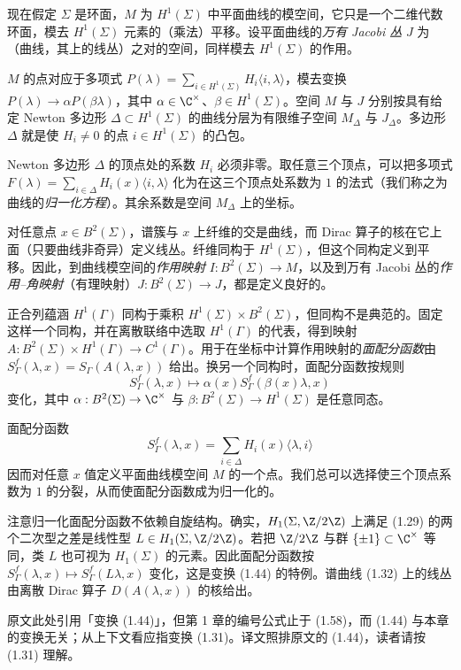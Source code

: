 现在假定 $\Sigma$ 是环面，$M$ 为 $H^1(\Sigma)$ 中平面曲线的模空间，它只是一个二维代数环面，模去 $H^1(\Sigma)$ 元素的（乘法）平移。设平面曲线的\emph{万有 Jacobi 丛} $J$ 为（曲线，其上的线丛）之对的空间，同样模去 $H^1(\Sigma)$ 的作用。

$M$ 的点对应于多项式 $P(\lambda)=\sum_{i\in H^1(\Sigma)}H_i\langle i,\lambda\rangle$，模去变换 $P(\lambda)\to\alpha P(\beta\lambda)$，其中 $\alpha\in\C^\times$、$\beta\in H^1(\Sigma)$。空间 $M$ 与 $J$ 分别按具有给定 Newton 多边形 $\Delta\subset H^1(\Sigma)$ 的曲线分层为有限维子空间 $M_\Delta$ 与 $J_\Delta$。多边形 $\Delta$ 就是使 $H_i\neq0$ 的点 $i\in H^1(\Sigma)$ 的凸包。

Newton 多边形 $\Delta$ 的顶点处的系数 $H_i$ 必须非零。取任意三个顶点，可以把多项式 $F(\lambda)=\sum_{i\in\Delta}H_i(x)\langle i,\lambda\rangle$ 化为在这三个顶点处系数为 $1$ 的法式（我们称之为曲线的\emph{归一化方程}）。其余系数是空间 $M_\Delta$ 上的坐标。

对任意点 $x\in B^2(\Sigma)$，谱簇与 $x$ 上纤维的交是曲线，而 Dirac 算子的核在它上面（只要曲线非奇异）定义线丛。纤维同构于 $H^1(\Sigma)$，但这个同构定义到平移。因此，到曲线模空间的\emph{作用映射} $I: B^2(\Sigma)\to M$，以及到万有 Jacobi 丛的\emph{作用–角映射}（有理映射）$J: B^2(\Sigma)\to J$，都是定义良好的。

正合列蕴涵 $H^1(\Gamma)$ 同构于乘积 $H^1(\Sigma)\times B^2(\Sigma)$，但同构不是典范的。固定这样一个同构，并在离散联络中选取 $H^1(\Gamma)$ 的代表，得到映射 $A: B^2(\Sigma)\times H^1(\Gamma)\to C^1(\Gamma)$。用于在坐标中计算作用映射的\emph{面配分函数}由 $S^f_\Gamma(\lambda,x)=S_\Gamma(A(\lambda,x))$ 给出。换另一个同构时，面配分函数按规则
\begin{equation}\label{eq:1.31}
S^f_\Gamma(\lambda,x)\mapsto\alpha(x)S^f_\Gamma(\beta(x)\lambda,x)
\tag{1.31}
\end{equation}
变化，其中 $\alpha: B^2(\Sigma)\to\C^\times$ 与 $\beta: B^2(\Sigma)\to H^1(\Sigma)$ 是任意同态。

面配分函数
\begin{equation}\label{eq:1.32}
S^f_\Gamma(\lambda,x)=\sum_{i\in\Delta}H_i(x)\langle\lambda,i\rangle
\tag{1.32}
\end{equation}
因而对任意 $x$ 值定义平面曲线模空间 $M$ 的一个点。我们总可以选择使三个顶点系数为 $1$ 的分裂，从而使面配分函数成为归一化的。

注意归一化面配分函数不依赖自旋结构。确实，$H_1(\Sigma,\Z/2\Z)$ 上满足 (1.29) 的两个二次型之差是线性型 $L\in H_1(\Sigma,\Z/2\Z)$。若把 $\Z/2\Z$ 与群 $\{\pm1\}\subset\C^\times$ 等同，类 $L$ 也可视为 $H_1(\Sigma)$ 的元素。因此面配分函数按 $S^f_\Gamma(\lambda,x)\mapsto S^f_\Gamma(L\lambda,x)$ 变化，这是变换 (1.44) 的特例。谱曲线 (1.32) 上的线丛由离散 Dirac 算子 $D(A(\lambda,x))$ 的核给出。
\begin{annote}
原文此处引用「变换 (1.44)」，但第 1 章的编号公式止于 (1.58)，而 (1.44) 与本章的变换无关；从上下文看应指变换 (1.31)。译文照排原文的 (1.44)，读者请按 (1.31) 理解。
\end{annote}

